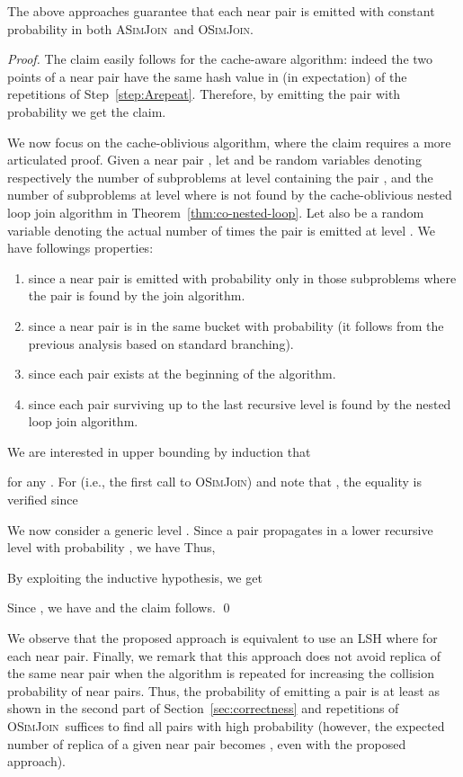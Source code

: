 \documentclass{llncs}
\newcommand{\SimJoin}{\textsc{OSimJoin}}
\newcommand{\ASimJoin}{\textsc{ASimJoin}}
\begin{document}
\begin{theorem}
The above approaches guarantee that each near pair is emitted with constant probability in both \ASimJoin\ and \SimJoin.
\end{theorem}
\begin{proof}
The claim easily follows for the cache-aware algorithm: indeed the two points of a near pair  have the same hash value in  (in expectation) of the  repetitions of Step~\ref{step:Arepeat}. 
Therefore, by emitting the  pair with probability  we get the claim.

We now focus on the cache-oblivious algorithm, where the claim requires a more articulated proof. 
Given a near pair , let  and  be random variables denoting respectively the number of subproblems at level  containing the pair , and the number of subproblems at level  where  is not found by the cache-oblivious nested loop join algorithm in Theorem~\ref{thm:co-nested-loop}.
Let also  be a random variable denoting the actual number of times the pair  is emitted at level . 
We have followings properties: 
\begin{enumerate}
	\item  since a near pair is emitted with probability  only in those subproblems where the pair is found by the join algorithm.
	\item  since a near pair is in the same bucket with probability  (it follows from the previous analysis based on standard branching).
	\item  since each pair exists at the beginning of the algorithm.
	\item  since each pair surviving up to the last recursive level is found by the nested loop join algorithm.
\end{enumerate}

We are interested in upper bounding  by induction that

for any .
For  (i.e., the first call to \SimJoin) and note that , the equality is verified since


We now consider a generic level . 
Since a pair  propagates in a lower recursive level with probability , we have  
Thus,

By exploiting the inductive hypothesis, we get

Since , we have  and the claim follows. \qed
\end{proof}

We observe that the proposed approach is equivalent to use an LSH where  for each near pair.
Finally, we  remark that this approach does not avoid replica of the same near pair when the algorithm is repeated for increasing the collision probability of near pairs. 
Thus, the probability of emitting a pair is at least  as shown in the second part of Section~\ref{sec:correctness} and  repetitions of \SimJoin\ suffices to find all pairs with high probability (however, the expected number of replica of a given near pair becomes , even with the proposed approach).
\end{document}
